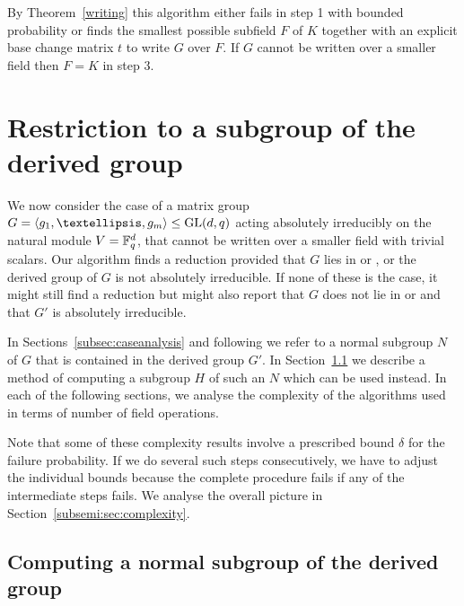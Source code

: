 By Theorem~\ref{writing} this algorithm either fails in step 1 with
bounded probability or finds the smallest possible subfield $F$ of $K$
together with an explicit base change matrix $t$ to write $G$ over $F$.
If $G$ cannot be written over a smaller field then $F = K$ in step $3$.


\section{Restriction to a subgroup of the derived group}
\label{subsemi:main}

We now consider the case of a matrix group $G = \langle g_1, \ldots, g_m
\rangle \leq \GL(d, q)$ acting absolutely
irreducibly on the natural module $V = \mathbb{F}_q^d$, that cannot be 
written over a smaller field with trivial scalars. Our algorithm
finds a reduction provided that $G$ lies in  or , 
or the derived group of $G$ is not absolutely irreducible. If none of these 
is the case, it might still find a reduction 
but might also report that $G$ does not lie in  or  and that $G'$ is absolutely irreducible.

In Sections~\ref{subsec:caseanalysis} and following we refer to a
normal subgroup $N$ of $G$ that is contained in the derived group
$G'$. In Section~\ref{subsec:derived} we describe a method of computing a
subgroup $H$ of such an $N$ which can be used instead. In each of the
following sections, we analyse the complexity of the algorithms used
in terms of number of field operations.

Note that some of these complexity results involve a prescribed bound
$\delta$ for the failure probability. If we do several such
steps consecutively, we have to adjust the individual bounds because
the complete procedure fails if any of the intermediate steps
fails. We analyse the overall picture in
Section~\ref{subsemi:sec:complexity}.

\subsection{Computing a normal subgroup of the derived group} 
\label{subsec:derived}


